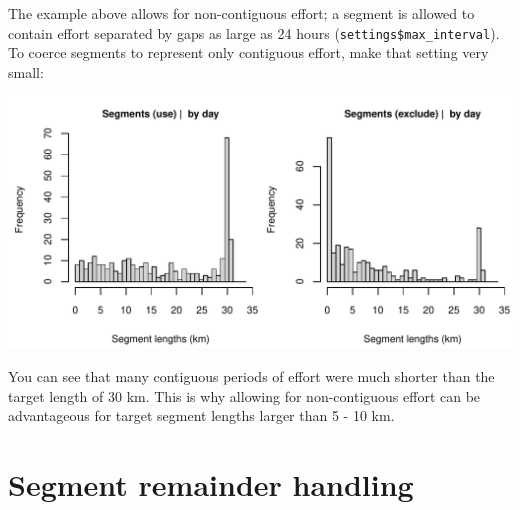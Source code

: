 \documentclass[
]{book}
\newenvironment{Shaded}{\begin{snugshade}}{\end{snugshade}}
\newcommand{\AttributeTok}[1]{\textcolor[rgb]{0.13,0.29,0.53}{#1}}
\newcommand{\CommentTok}[1]{\textcolor[rgb]{0.56,0.35,0.01}{\textit{#1}}}
\newcommand{\ConstantTok}[1]{\textcolor[rgb]{0.56,0.35,0.01}{#1}}
\newcommand{\DecValTok}[1]{\textcolor[rgb]{0.00,0.00,0.81}{#1}}
\newcommand{\FunctionTok}[1]{\textcolor[rgb]{0.13,0.29,0.53}{\textbf{#1}}}
\newcommand{\NormalTok}[1]{#1}
\newcommand{\OtherTok}[1]{\textcolor[rgb]{0.56,0.35,0.01}{#1}}
\newcommand{\SpecialCharTok}[1]{\textcolor[rgb]{0.81,0.36,0.00}{\textbf{#1}}}
\newcommand{\StringTok}[1]{\textcolor[rgb]{0.31,0.60,0.02}{#1}}
\begin{document}
The example above allows for non-contiguous effort; a segment is allowed to contain effort separated by gaps as large as 24 hours (\texttt{settings\$max\_interval}). To coerce segments to represent only contiguous effort, make that setting very small:

\begin{Shaded}
\end{Shaded}

\includegraphics{figures/unnamed-chunk-402-1.pdf}

You can see that many contiguous periods of effort were much shorter than the target length of 30 km. This is why allowing for non-contiguous effort can be advantageous for target segment lengths larger than 5 - 10 km.

\hypertarget{segment-remainder-handling}{%
\section*{Segment remainder handling}\label{segment-remainder-handling}}
\end{document}

